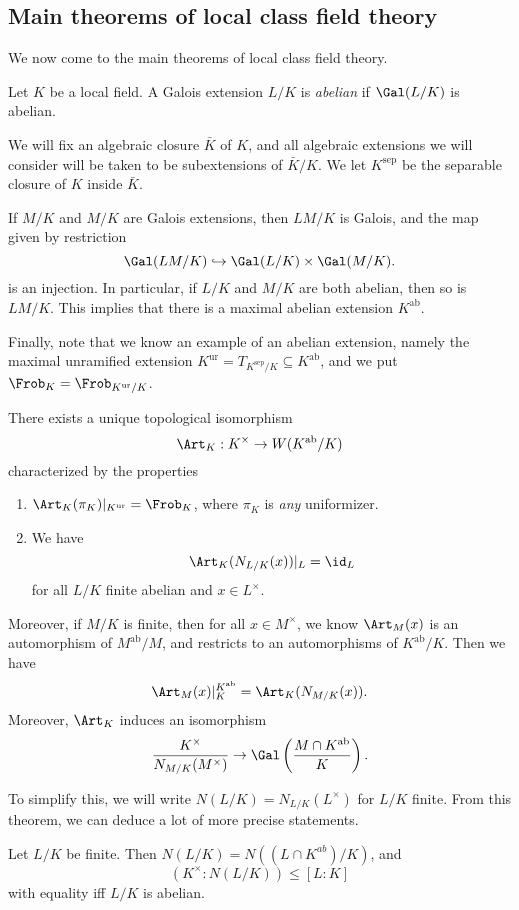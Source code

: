 \documentclass[a4paper]{article}
\begin{document}
\subsection{Main theorems of local class field theory}
We now come to the main theorems of local class field theory.
\begin{defi}
  Let $K$ be a local field. A Galois extension $L/K$ is \emph{abelian} if $\Gal(L/K)$ is abelian.
\end{defi}

We will fix an algebraic closure $\bar{K}$ of $K$, and all algebraic extensions we will consider will be taken to be subextensions of $\bar{K}/K$. We let $K^{\mathrm{sep}}$ be the separable closure of $K$ inside $\bar{K}$.

If $M/K$ and $M/K$ are Galois extensions, then $LM/K$ is Galois, and the map given by restriction
\[
  \Gal(LM/K) \hookrightarrow \Gal(L/K) \times \Gal(M/K).
\]
is an injection. In particular, if $L/K$ and $M/K$ are both abelian, then so is $LM/K$. This implies that there is a maximal abelian extension $K^{\mathrm{ab}}$.

Finally, note that we know an example of an abelian extension, namely the maximal unramified extension $K^{\mathrm{ur}} = T_{K^{\mathrm{sep}}/K} \subseteq K^{\mathrm{ab}}$, and we put $\Frob_K = \Frob_{K^{\mathrm{ur}}/K}$.

\begin{thm}
  There exists a unique topological isomorphism
  \[
    \Art_K: K^\times \to W(K^{\mathrm{ab}}/K)
  \]
  characterized by the properties
  \begin{enumerate}
    \item $\Art_K(\pi_K)|_{K^{\mathrm{ur}}} = \Frob_K$, where $\pi_K$ is \emph{any} uniformizer.
    \item We have
      \[
        \Art_K(N_{L/K}(x))|_L = \id_L
      \]
      for all $L/K$ finite abelian and $x \in L^\times$.
  \end{enumerate}
  Moreover, if $M/K$ is finite, then for all $x \in M^\times$, we know $\Art_M(x)$ is an automorphism of $M^{\mathrm{ab}}/M$, and restricts to an automorphisms of $K^{\mathrm{ab}}/K$. Then we have
  \[
    \Art_M(x)|_K^{K^{\mathrm{ab}}} = \Art_K(N_{M/K}(x)).
  \]
  Moreover, $\Art_K$ induces an isomorphism
  \[
    \frac{K^\times}{N_{M/K}(M^\times)} \to \Gal\left(\frac{M\cap K^{\mathrm{ab}}}{K}\right).
  \]
\end{thm}

To simplify this, we will write $N(L/K) = N_{L/K}(L^\times)$ for $L/K$ finite. From this theorem, we can deduce a lot of more precise statements.
\begin{cor}
  Let $L/K$ be finite. Then $N(L/K) = N((L \cap K^{ab})/K)$, and
  \[
    (K^\times : N(L/K)) \leq [L:K]
  \]
  with equality iff $L/K$ is abelian.
\end{cor}
\end{document}
